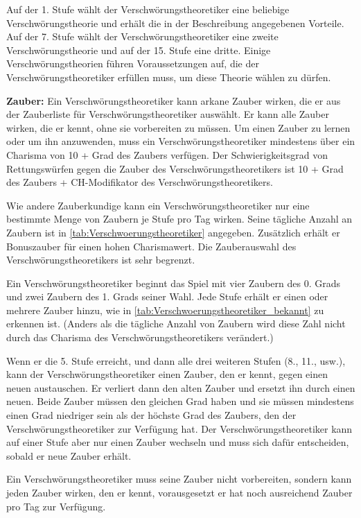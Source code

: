 \documentclass[
	ngerman,
	a4paper,
	11pt,
	twocolumn,
]{scrartcl}
\begin{document}
Auf der 1. Stufe wählt der Verschwörungstheoretiker eine beliebige Verschwörungstheorie und erhält die in der Beschreibung angegebenen Vorteile. Auf der 7. Stufe wählt der Verschwörungstheoretiker eine zweite Verschwörungstheorie und auf der 15. Stufe eine dritte. Einige Verschwörungstheorien führen Voraussetzungen auf, die der Verschwörungstheoretiker erfüllen muss, um diese Theorie wählen zu dürfen.

\textbf{Zauber:} Ein Verschwörungstheoretiker kann arkane Zauber wirken, die er aus der Zauberliste für Verschwörungstheoretiker auswählt. Er kann alle Zauber wirken,  die er kennt, ohne sie vorbereiten zu müssen. Um einen Zauber zu lernen oder um ihn anzuwenden, muss ein Verschwörungstheoretiker mindestens über ein Charisma von 10 + Grad des Zaubers verfügen. Der Schwierigkeitsgrad von Rettungswürfen gegen die Zauber des Verschwörungstheoretikers ist 10 + Grad des Zaubers + CH-Modifikator des Verschwörungstheoretikers.

Wie andere Zauberkundige kann ein Verschwörungstheoretiker nur eine bestimmte Menge von Zaubern je Stufe pro Tag wirken. Seine tägliche Anzahl an Zaubern ist in \autoref{tab:Verschwoerungstheoretiker} angegeben. Zusätzlich erhält er Bonuszauber für einen hohen Charismawert. Die Zauberauswahl des Verschwörungstheoretikers ist sehr begrenzt.

Ein Verschwörungstheoretiker beginnt das Spiel mit vier Zaubern des 0. Grads und zwei Zaubern des 1. Grads seiner Wahl. Jede Stufe erhält er einen oder mehrere Zauber hinzu, wie in \autoref{tab:Verschwoerungstheoretiker_bekannt} zu erkennen ist. (Anders als die tägliche Anzahl von Zaubern wird diese Zahl nicht durch das Charisma des Verschwörungstheoretikers verändert.)

Wenn er die 5. Stufe erreicht, und dann alle drei weiteren Stufen (8., 11., usw.), kann der Verschwörungstheoretiker einen Zauber, den er kennt, gegen einen neuen austauschen. Er verliert dann den alten Zauber und ersetzt ihn durch einen neuen. Beide Zauber müssen den gleichen Grad haben und sie müssen mindestens einen Grad niedriger sein als der höchste Grad des Zaubers, den der Verschwörungstheoretiker zur Verfügung hat. Der Verschwörungstheoretiker kann auf einer Stufe aber nur einen Zauber wechseln und muss sich dafür entscheiden, sobald er neue Zauber erhält.

Ein Verschwörungstheoretiker muss seine Zauber nicht vorbereiten, sondern kann jeden Zauber wirken, den er kennt, vorausgesetzt er hat noch ausreichend Zauber pro Tag zur Verfügung.
\end{document}
